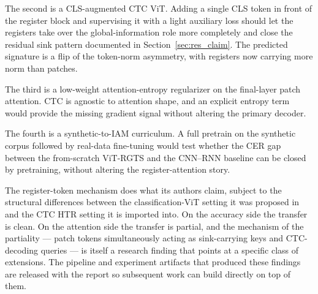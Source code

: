 The second is a CLS-augmented CTC ViT. Adding a single CLS token in front of the register block and supervising it with a light auxiliary loss should let the registers take over the global-information role more completely and close the residual sink pattern documented in Section~\ref{sec:res_claim}. The predicted signature is a flip of the token-norm asymmetry, with registers now carrying more norm than patches.

The third is a low-weight attention-entropy regularizer on the final-layer patch attention. CTC is agnostic to attention shape, and an explicit entropy term would provide the missing gradient signal without altering the primary decoder.

The fourth is a synthetic-to-IAM curriculum. A full pretrain on the synthetic corpus followed by real-data fine-tuning would test whether the CER gap between the from-scratch ViT-RGTS and the CNN--RNN baseline can be closed by pretraining, without altering the register-attention story.

The register-token mechanism does what its authors claim, subject to the structural differences between the classification-ViT setting it was proposed in and the CTC HTR setting it is imported into. On the accuracy side the transfer is clean. On the attention side the transfer is partial, and the mechanism of the partiality --- patch tokens simultaneously acting as sink-carrying keys and CTC-decoding queries --- is itself a research finding that points at a specific class of extensions. The pipeline and experiment artifacts that produced these findings are released with the report so subsequent work can build directly on top of them.
